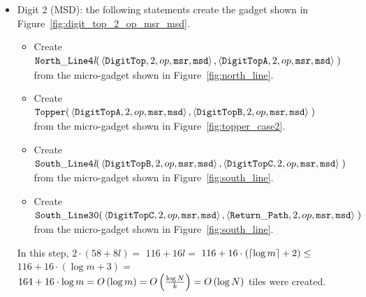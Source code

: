 \begin{itemize}
        \item Digit 2 (MSD): the following statements create the gadget shown in Figure~\ref{fig:digit_top_2_op_msr_msd}.
        \begin{itemize}
            \item Create
            $\begin{aligned}[t]
                {\tt North\_Line4\textit{l}}(& \left\langle {\tt DigitTop},  2, \inc, {\tt msr}, {\tt msd} \right\rangle,
                                               \left\langle {\tt DigitTopA}, 2, \inc, {\tt msr}, {\tt msd} \right\rangle\;)
            \end{aligned}$\\ from the micro-gadget shown in Figure~\ref{fig:north_line}.

            \item Create
            $\begin{aligned}[t]
                {\tt Topper}(& \left\langle {\tt DigitTopA}, 2, \inc, {\tt msr}, {\tt msd} \right\rangle,
                               \left\langle {\tt DigitTopB}, 2, \inc, {\tt msr}, {\tt msd} \right\rangle \;)
            \end{aligned}$\\from the micro-gadget shown in Figure~\ref{fig:topper_case2}.

            \item Create
            $\begin{aligned}[t]
                {\tt South\_Line4\textit{l}}(& \left\langle {\tt DigitTopB}, 2, \inc, {\tt msr}, {\tt msd} \right\rangle,
                                               \left\langle {\tt DigitTopC}, 2, \inc, {\tt msr}, {\tt msd} \right\rangle \;)
            \end{aligned}$\\from the micro-gadget shown in Figure~\ref{fig:south_line}.

            \item Create
            $\begin{aligned}[t]
                {\tt South\_Line30}(& \left\langle {\tt DigitTopC}, 2, \inc, {\tt msr}, {\tt msd} \right\rangle,
                                      \left\langle \returnpath,     2, \inc, {\tt msr}, {\tt msd}\right\rangle \;)
            \end{aligned}$\\from the micro-gadget shown in Figure~\ref{fig:south_line}.
        \end{itemize}
        In this step, $2 \cdot \left( 58 + 8l \right) =$
        $116 + 16l =$
        $116 + 16 \cdot \left( \ceil*{\log m} + 2 \right) \leq$
        $116 + 16 \cdot \left( {\log m} + 3 \right) =$
        $164 + 16 \cdot {\log m} = \bigologm$ tiles were created.
        \vspace{0.5cm}



\end{itemize}
